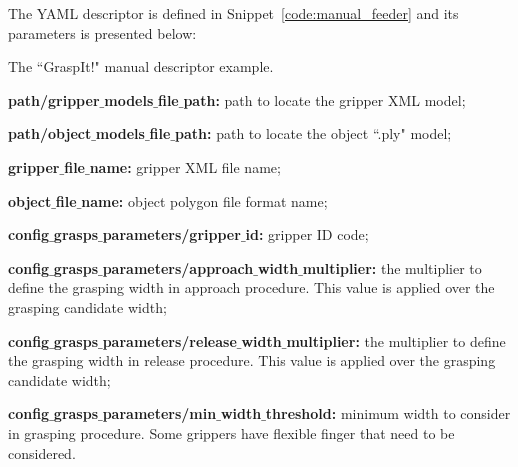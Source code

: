 The YAML descriptor is defined in Snippet~\ref{code:manual_feeder} and its parameters is presented below:

\begin{snippet}[h!]
	\centering
	\caption{The ``GraspIt!" manual descriptor example.}
	\label{code:manual_feeder}
\end{snippet}

\begin{itemize_jp}
    \item \textbf{path/gripper$\_$models$\_$file$\_$path:} path to locate the gripper XML model;
    \item \textbf{path/object$\_$models$\_$file$\_$path:} path to locate the object ``.ply" model;
    \item \textbf{gripper$\_$file$\_$name:} gripper XML file name;
    \item \textbf{object$\_$file$\_$name:} object polygon file format name;
    \item \textbf{config$\_$grasps$\_$parameters/gripper$\_$id:} gripper ID code;
    \item \textbf{config$\_$grasps$\_$parameters/approach$\_$width$\_$multiplier:} the multiplier to define the grasping width in approach procedure. This value is applied over the grasping candidate width;
    \item \textbf{config$\_$grasps$\_$parameters/release$\_$width$\_$multiplier:} the multiplier to define the grasping width in release procedure. This value is applied over the grasping candidate width;
    \item \textbf{config$\_$grasps$\_$parameters/min$\_$width$\_$threshold:} minimum width to consider in grasping procedure. Some grippers have flexible finger that need to be considered.
\end{itemize_jp}

